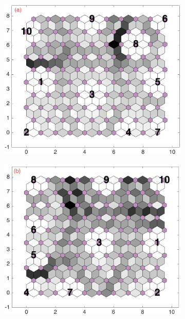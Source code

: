 \begin{figure}
    \begin{subfigure}[b]{0.25\textwidth}
        \centering
        \includegraphics[width=\textwidth]{../../images0.01/M31/2D/diff_dimension/combine_2D_data_between_cols3and11.png}
        \label{fig: col3and11_dist}
    \end{subfigure}
    \hfill
    \begin{subfigure}[b]{0.25\textwidth}
        \centering
        \includegraphics[width=\textwidth]{../../images0.01/M31/2D/diff_dimension/combine_2D_data_between_cols3and12.png}

\end{subfigure}
\end{figure}
